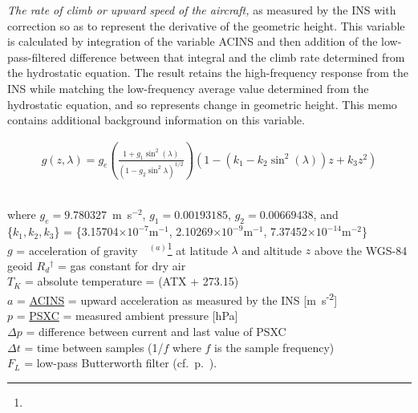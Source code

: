\documentclass[
]{book}
\begin{document}
\emph{The rate of climb or upward speed of the aircraft,} as measured by the INS with correction so as to represent the derivative of the geometric height. This variable is calculated by integration of the variable ACINS and then addition of the low-pass-filtered difference between that integral and the climb rate determined from the hydrostatic equation. The result retains the high-frequency response from the INS while matching the low-frequency average value determined from the hydrostatic equation, and so represents change in geometric height. This memo contains additional background information on this variable.

\begin{align}
g(z,\lambda)=g_{e}\left(\frac{1+g_{1}\sin^{2}(\lambda)}{(1-g_{2}\sin^{2}\lambda)^{1/2}}\right)(1-(k_{1}-k_{2}\sin^{2}(\lambda))z+k_{3}z^{2})\\\\
\label{eq:gsublambda}
\end{align}\\
\hspace*{0.333em}\hspace*{0.333em}\hspace*{0.333em}\hspace*{0.333em}\hspace*{0.333em}\hspace*{0.333em}\hspace*{0.333em}where \(g_{e}=9.780327\)~m~s\(^{-2}\), \(g_{1}=0.00193185\), \(g_{2}=0.00669438\), and\\
\hspace*{0.333em}\hspace*{0.333em}\hspace*{0.333em}\hspace*{0.333em}\hspace*{0.333em}\hspace*{0.333em}\hspace*{0.333em} \{\(k_{1},k_{2},k_{3}\)\} = \{3.15704\(\times 10^{-7}\mathrm{m}^{-1}\),
2.10269\(\times 10^{-9}\mathrm{m}^{-1}\), 7.37452\(\times 10^{-14}\mathrm{m}^{-2}\)\}\\
\(g\) = \label{-constant-g}acceleration of gravity~~\(^{(a)}\)\footnote{ } at latitude \(\lambda\) and altitude \(z\) above the WGS-84 geoid
\(R_{d}{}^{\dagger}\) = gas constant for dry air\\
\(T_{K}\) = absolute temperature = (ATX + 273.15)\\
\(a\) = \protect\hyperlink{acins}{ACINS} = upward acceleration as measured by the INS {[}m~s\textsuperscript{-2}{]}\\
\(p\) = \protect\hyperlink{psx}{PSXC} = measured ambient pressure {[}hPa{]}\\
\(\Delta p\) = difference between current and last value of PSXC\\
\(\Delta t\) = time between samples (1/\(f\) where \(f\) is the sample
frequency)\\
\(F_{L}\) = low-pass Butterworth filter (cf.~p.~\pageref{compFilter}).
\end{document}
